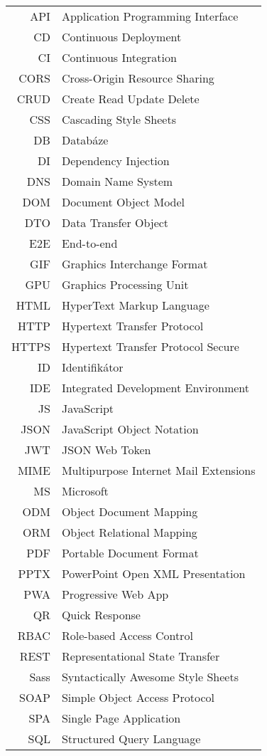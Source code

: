 \begin{longtable}{rl}
API & Application Programming Interface\\
CD & Continuous Deployment\\
CI & Continuous Integration\\
CORS & Cross-Origin Resource Sharing\\
CRUD & Create Read Update Delete\\
CSS & Cascading Style Sheets\\
DB & Databáze\\
DI & Dependency Injection\\
DNS & Domain Name System\\
DOM & Document Object Model\\
DTO & Data Transfer Object\\
E2E & End-to-end\\
GIF & Graphics Interchange Format\\
GPU & Graphics Processing Unit\\
HTML & HyperText Markup Language\\
HTTP & Hypertext Transfer Protocol\\
HTTPS & Hypertext Transfer Protocol Secure\\
ID & Identifikátor\\
IDE & Integrated Development Environment\\
JS & JavaScript\\
JSON & JavaScript Object Notation\\
JWT & JSON Web Token\\
MIME & Multipurpose Internet Mail Extensions\\
MS & Microsoft\\
ODM & Object Document Mapping\\
ORM & Object Relational Mapping\\
PDF & Portable Document Format\\
PPTX & PowerPoint Open XML Presentation\\
PWA & Progressive Web App\\
QR & Quick Response\\
RBAC & Role-based Access Control\\
REST & Representational State Transfer\\
Sass & Syntactically Awesome Style Sheets\\
SOAP & Simple Object Access Protocol\\
SPA & Single Page Application\\
SQL & Structured Query Language\\

\end{longtable}
